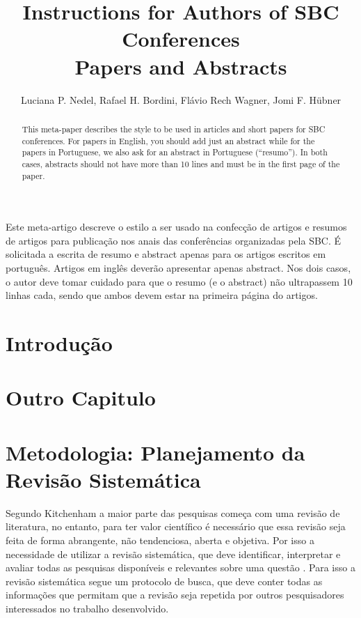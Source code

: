 \documentclass[12pt]{article}
\title{Instructions for Authors of SBC Conferences\\ Papers and Abstracts}
\author{Luciana P. Nedel\inst{1}, Rafael H. Bordini\inst{2}, Flávio Rech
  Wagner\inst{1}, Jomi F. Hübner\inst{3} }
\begin{document}
 

\maketitle

\begin{abstract}
  This meta-paper describes the style to be used in articles and short papers
  for SBC conferences. For papers in English, you should add just an abstract
  while for the papers in Portuguese, we also ask for an abstract in
  Portuguese (``resumo''). In both cases, abstracts should not have more than
  10 lines and must be in the first page of the paper.
\end{abstract}
     
\begin{resumo} 
  Este meta-artigo descreve o estilo a ser usado na confecção de artigos e
  resumos de artigos para publicação nos anais das conferências organizadas
  pela SBC. É solicitada a escrita de resumo e abstract apenas para os artigos
  escritos em português. Artigos em inglês deverão apresentar apenas abstract.
  Nos dois casos, o autor deve tomar cuidado para que o resumo (e o abstract)
  não ultrapassem 10 linhas cada, sendo que ambos devem estar na primeira
  página do artigos.
\end{resumo}

\section{Introdução}\label{sec1}

\section{Outro Capitulo} \label{sec2}

\section{Metodologia: Planejamento da Revisão Sistemática} \label{sec3}

Segundo Kitchenham \cite{kitchenham2004procedures} a maior parte das pesquisas começa com uma revisão de literatura, no entanto, para ter valor científico é necessário que essa revisão seja feita de forma abrangente, não tendenciosa, aberta e objetiva. Por isso a necessidade de utilizar a revisão sistemática, que deve identificar, interpretar e avaliar todas as pesquisas disponíveis e relevantes sobre uma questão \cite{keele2007guidelines}. Para isso a revisão sistemática segue um protocolo de busca, que deve conter todas as informações que permitam que a revisão seja repetida por outros pesquisadores interessados no trabalho desenvolvido.
\end{document}

